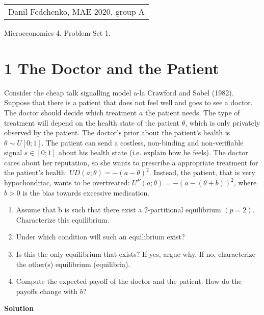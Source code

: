 \documentclass[a4paper]{article}
\begin{document}
	\begin{flushright}
	\begin{tabular}{r}
		Danil Fedchenko, MAE 2020, group A \\
	\end{tabular}
\end{flushright}


\begin{center}
	Microeconomics 4. Problem Set 1.
\end{center}
\section*{1 The Doctor and the Patient}
Consider the cheap talk signalling model a-la Crawford and Sobel (1982). Suppose that
there is a patient that does not feel well and goes to see a doctor. The doctor should
decide which treatment $a$ the patient needs. The type of treatment will depend on
the health state of the patient $\theta$, which is only privately observed by the patient. The
doctor's prior about the patient's health is $\theta \sim U[0; 1]$. The patient can send a costless,
non-binding and non-verifiable signal $s \in [0; 1]$ about his health state (i.e. explain how
he feels). The doctor cares about her reputation, so she wants to prescribe a appropriate
treatment for the patient's health: $U
D(a; \theta) = -(a-\theta)^2$. Instead, the patient, that is
very hypochondriac, wants to be overtreated: $U^P(a; \theta) = -(a - (\theta + b))^2$, where $b > 0$ is
the bias towards excessive medication.
\begin{enumerate}
	\item Assume that b is such that there exist a 2-partitional equilibrium $(p = 2)$. Characterize this equilibrium.
	\item Under which condition will such an equilibrium exist?
	\item Is this the only equilibrium that exists? If yes, argue why. If no, characterize the
	other(s) equilibrium (equilibria).
	\item Compute the expected payoff of the doctor and the patient. How do the payoffs
	change with $b$?
\end{enumerate}

\textbf{Solution}
\end{document}
